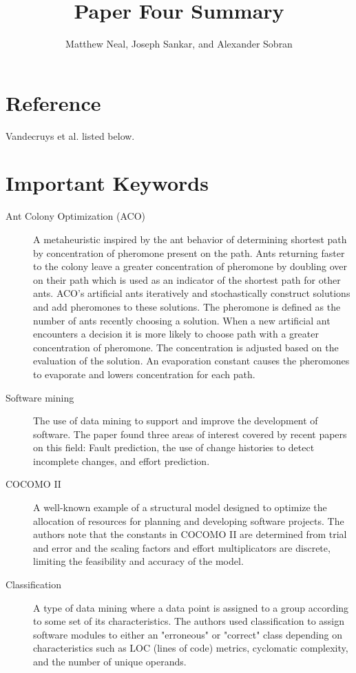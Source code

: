 \documentclass[english]{article}
\begin{document}
\title{Paper Four Summary}


\author{Matthew Neal, Joseph Sankar, and Alexander Sobran}

\maketitle

\section*{Reference}

Vandecruys et al. \cite{Vandecruys08} listed below.


\section*{Important Keywords}
\begin{description}
\item [{Ant Colony Optimization (ACO)}] A metaheuristic inspired by the ant behavior of determining shortest path by concentration of pheromone present on the path. Ants returning faster to the colony leave a greater concentration of pheromone by doubling over on their path which is used as an indicator of the shortest path for other ants. ACO's artificial ants iteratively and stochastically construct solutions and add pheromones to these solutions. The pheromone is defined as the number of ants recently choosing a solution. When a new artificial ant encounters a decision it is more likely to choose path with a greater concentration of pheromone. The concentration is adjusted based on the evaluation of the solution. An evaporation constant causes the pheromones to evaporate and lowers concentration for each path.
\item [{Software mining}] The use of data mining to support and improve the development of software. The paper found three areas of interest covered by recent papers on this field: Fault prediction, the use of change histories to detect incomplete changes, and effort prediction.
\item[{COCOMO II}] A well-known example of a structural model designed to optimize the allocation of resources for planning and developing software projects. The authors note that the constants in COCOMO II are determined from trial and error and the scaling factors and effort multiplicators are discrete, limiting the feasibility and accuracy of the model.
\item[{Classification}] A type of data mining where a data point is assigned to a group according to some set of its characteristics. The authors used classification to assign software modules to either an "erroneous" or "correct" class depending on characteristics such as LOC (lines of code) metrics, cyclomatic complexity, and the number of unique operands.
\end{description}
\end{document}
